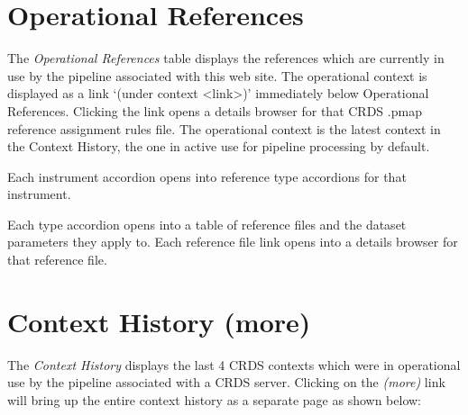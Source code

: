 \documentclass[letterpaper,10pt,english]{sphinxmanual}
\begin{document}
\section{Operational References}
\label{web_site_use:operational-references}
The \emph{Operational References} table displays the references which are currently in use
by the pipeline associated with this web site.   The operational context is displayed
as a link `(under context \textless{}link\textgreater{})' immediately below Operational References.  Clicking
the link opens a details browser for that CRDS .pmap reference assignment rules file.
The operational context is the latest context in the Context History,  the one in
active use for pipeline processing by default.

Each instrument accordion opens into reference type accordions for that instrument.

Each type accordion opens into a table of reference files and the dataset parameters
they apply to.   Each reference file link opens into a details browser for that reference
file.


\section{Context History (more)}
\label{web_site_use:context-history-more}
The \emph{Context History} displays the last 4 CRDS contexts which were in operational use by
the pipeline associated with a CRDS server. Clicking on the \emph{(more)} link will bring up
the entire context history as a separate page as shown below:
\begin{figure}[htbp]
\centering

\end{figure}
\end{document}

